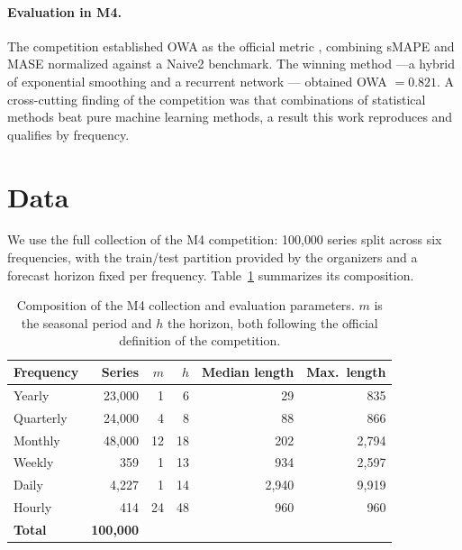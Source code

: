 \paragraph{Evaluation in M4.} The competition established OWA as the official metric
\cite{makridakis2020}, combining sMAPE and MASE normalized against a Naive2 benchmark. The
winning method ---a hybrid of exponential smoothing and a recurrent network
\cite{smyl2020}--- obtained OWA $=0.821$. A cross-cutting finding of the competition was
that combinations of statistical methods beat pure machine learning methods, a result this
work reproduces and qualifies by frequency.


\section{Data}\label{sec:datos}

We use the full collection of the M4 competition: 100{,}000 series split across six
frequencies, with the train/test partition provided by the organizers and a forecast
horizon fixed per frequency. Table~\ref{tab:datos} summarizes its composition.

\begin{table}[htbp]
\centering
\caption{Composition of the M4 collection and evaluation parameters. $m$ is the seasonal
period and $h$ the horizon, both following the official definition of the competition.}
\label{tab:datos}
\begin{tabular}{lrrrrr}
\toprule
\textbf{Frequency} & \textbf{Series} & \textbf{$m$} & \textbf{$h$}
                   & \textbf{Median length} & \textbf{Max.\ length} \\
\midrule
Yearly     & 23{,}000 & 1  & 6  & 29    & 835 \\
Quarterly  & 24{,}000 & 4  & 8  & 88    & 866 \\
Monthly    & 48{,}000 & 12 & 18 & 202   & 2{,}794 \\
Weekly     & 359      & 1  & 13 & 934   & 2{,}597 \\
Daily      & 4{,}227  & 1  & 14 & 2{,}940 & 9{,}919 \\
Hourly     & 414      & 24 & 48 & 960   & 960 \\
\midrule
\textbf{Total} & \textbf{100{,}000} & & & & \\
\bottomrule
\end{tabular}
\end{table}

